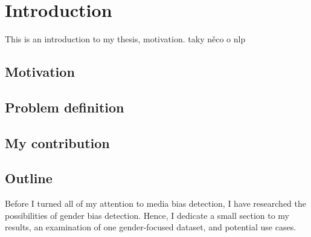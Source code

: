 \chapter{Introduction}
This is an introduction to my thesis, motivation. taky něco o nlp
\section{Motivation}

\section{Problem definition}
\section{My contribution}
\section{Outline}
Before I turned all of my attention to media bias detection, I have researched the possibilities of gender bias detection. Hence, I dedicate a small section to my results, an examination of one gender-focused dataset, and potential use cases.
